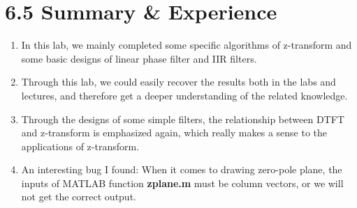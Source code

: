 \documentclass[onecolumn,oneside]{SUSTechHomework}
\begin{document}
\section*{6.5 Summary \& Experience}
\begin{enumerate}
    \item In this lab, we mainly completed some specific algorithms of z-transform and some basic designs of linear phase filter and
    IIR filters.
    \item Through this lab, we could easily recover the results both in the labs and lectures, and therefore get a deeper understanding
    of the related knowledge.
    \item Through the designs of some simple filters, the relationship between DTFT and z-transform is emphasized again, which really makes a sense
    to the applications of z-transform. 
    \item An interesting bug I found: When it comes to drawing zero-pole plane, the inputs of MATLAB function \textbf{zplane.m} must be
    column vectors, or we will not get the correct output. 
\end{enumerate}
\end{document}
